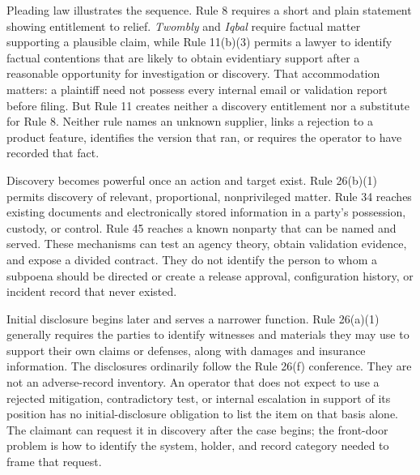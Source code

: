 Pleading law illustrates the sequence. Rule 8 requires a short and plain statement showing entitlement to relief. \emph{Twombly} and \emph{Iqbal} require factual matter supporting a plausible claim, while Rule 11(b)(3) permits a lawyer to identify factual contentions that are likely to obtain evidentiary support after a reasonable opportunity for investigation or discovery. That accommodation matters: a plaintiff need not possess every internal email or validation report before filing. But Rule 11 creates neither a discovery entitlement nor a substitute for Rule 8. Neither rule names an unknown supplier, links a rejection to a product feature, identifies the version that ran, or requires the operator to have recorded that fact.

Discovery becomes powerful once an action and target exist. Rule 26(b)(1) permits discovery of relevant, proportional, nonprivileged matter. Rule 34 reaches existing documents and electronically stored information in a party's possession, custody, or control. Rule 45 reaches a known nonparty that can be named and served. These mechanisms can test an agency theory, obtain validation evidence, and expose a divided contract. They do not identify the person to whom a subpoena should be directed or create a release approval, configuration history, or incident record that never existed.

Initial disclosure begins later and serves a narrower function. Rule 26(a)(1) generally requires the parties to identify witnesses and materials they may use to support their own claims or defenses, along with damages and insurance information. The disclosures ordinarily follow the Rule 26(f) conference. They are not an adverse-record inventory. An operator that does not expect to use a rejected mitigation, contradictory test, or internal escalation in support of its position has no initial-disclosure obligation to list the item on that basis alone. The claimant can request it in discovery after the case begins; the front-door problem is how to identify the system, holder, and record category needed to frame that request.

